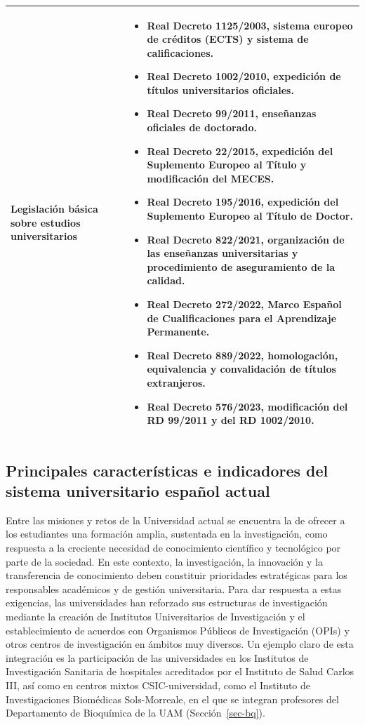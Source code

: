 \documentclass[
  11pt,
  a4paper,
  twoside]{scrreprt}
\begin{document}
\begin{longtable}{p{5cm} p{10cm}}
\textbf{Legislación básica sobre estudios universitarios} &
\begin{itemize}
\item \textbf{Real Decreto 1125/2003}, sistema europeo de créditos (ECTS) y sistema de calificaciones.
\item \textbf{Real Decreto 1002/2010}, expedición de títulos universitarios oficiales.
\item \textbf{Real Decreto 99/2011}, enseñanzas oficiales de doctorado.
\item \textbf{Real Decreto 22/2015}, expedición del Suplemento Europeo al Título y modificación del MECES.
\item \textbf{Real Decreto 195/2016}, expedición del Suplemento Europeo al Título de Doctor.
\item \textbf{Real Decreto 822/2021}, organización de las enseñanzas universitarias y procedimiento de aseguramiento de la calidad.
\item \textbf{Real Decreto 272/2022}, Marco Español de Cualificaciones para el Aprendizaje Permanente.
\item \textbf{Real Decreto 889/2022}, homologación, equivalencia y convalidación de títulos extranjeros.
\item \textbf{Real Decreto 576/2023}, modificación del RD 99/2011 y del RD 1002/2010.
\end{itemize}
\\ \hline

\end{longtable}

\subsection{Principales características e indicadores del sistema
universitario español
actual}\label{principales-caracteruxedsticas-e-indicadores-del-sistema-universitario-espauxf1ol-actual}

Entre las misiones y retos de la Universidad actual se encuentra la de
ofrecer a los estudiantes una formación amplia, sustentada en la
investigación, como respuesta a la creciente necesidad de conocimiento
científico y tecnológico por parte de la sociedad. En este contexto, la
investigación, la innovación y la transferencia de conocimiento deben
constituir prioridades estratégicas para los responsables académicos y
de gestión universitaria. Para dar respuesta a estas exigencias, las
universidades han reforzado sus estructuras de investigación mediante la
creación de Institutos Universitarios de Investigación y el
establecimiento de acuerdos con Organismos Públicos de Investigación
(OPIs) y otros centros de investigación en ámbitos muy diversos. Un
ejemplo claro de esta integración es la participación de las
universidades en los Institutos de Investigación Sanitaria de hospitales
acreditados por el Instituto de Salud Carlos III, así como en centros
mixtos CSIC-universidad, como el Instituto de Investigaciones Biomédicas
Sols-Morreale, en el que se integran profesores del Departamento de
Bioquímica de la UAM (Sección~\ref{sec-bq}).
\end{document}
